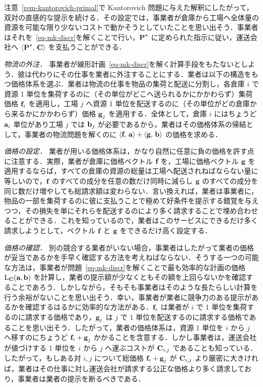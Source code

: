\begin{rem}\label{rem-kantorovich-dual}
注意~\ref{rem-kantorovich-primal}で Kantorovich 問題に与えた解釈にしたがって，双対の直感的な提示を続ける．その設定では，事業者が倉庫から工場へ全体量の資源を可能な限り少ないコストで動かそうとしていたことを思い出そう．事業者はそれを~\eqref{eq-mk-discr}を解くことで行い，$\P^\star$ に定められた指示に従い，運送会社へ $\dotp{\P^\star}{\C}$ を支払うことができる．

\emph{物流の外注．} 事業者が線形計画~\eqref{eq-mk-discr}を解く計算手段をもたないとしよう．彼は代わりにその仕事を業者に外注することにする．業者は以下の構造をもつ価格体系を選ぶ．業者は物流の仕事を物品の集荷と配送に分割し，各倉庫 $i$ で資源 1 単位を集荷するのに（その単位がどこへ送られるかにかかわらず）集荷価格 $\fD_i$ を適用し，工場 $j$ へ資源 1 単位を配送するのに（その単位がどの倉庫から来るかにかかわらず）価格 $\gD_j$ を適用する．全体として，倉庫 $i$ にはちょうど $\a_i$ 単位があり工場 $j$ では $\b_j$ が必要であるから，業者はその価格体系の帰結として，事業者の物流問題を解くのに $\dotp{\fD}{\a}+\dotp{\gD}{\b}$ の価格を求める．

\emph{価格の設定．} 業者が用いる価格体系は，かなり自然に任意に負の価格を許す点に注意する．実際，業者が倉庫に価格ベクトル $\fD$ を，工場に価格ベクトル $\gD$ を適用するならば，すべての倉庫の資源の総量は工場へ配送されねばならない量に等しいので，$\fD$ のすべての成分を任意の数だけ同時に減らし $\gD$ のすべての成分を同じ数だけ増やしても総請求額は変わらない．言い換えれば，業者は事業者に，物品の一部を集荷するのに彼に支払うことで極めて好条件を提示する錯覚を与えつつ，その損失を単にそれらを配送するのにより多く請求することで埋め合わせることができる．これを知っているので，業者はこのサービスにできるだけ多く請求しようとして，ベクトル $\fD$ と $\gD$ をできるだけ高く設定する．

\emph{価格の確認．} 別の競合する業者がいない場合，事業者はしたがって業者の価格が妥当であるかを手早く確認する方法を考えねばならない．そうする一つの可能な方法は，事業者が問題~\eqref{eq-mk-discr}を解くことで最も効率的な計画の価格 $\MKD_{\C}(\a,\b)$ を計算し，業者の提示額が少なくともその額を上回らないかを確認することであろう．しかしながら，そもそも事業者はそのような長たらしい計算を行う余裕がないことを思い出そう．幸い，事業者が業者に競争力のある提示があるかを確認するはるかに効率的な方法がある．$\fD_i$ は業者が $i$ で 1 単位を集荷するのに請求する価格であり，$\gD_j$ は $j$ で 1 単位を配送するのに請求する価格であることを思い出そう．したがって，業者の価格体系は，資源 1 単位を $i$ から $j$ へ移すのにちょうど $\fD_i+\gD_j$ かかることを含意する．しかし事業者は，運送会社が値づけする 1 単位を $i$ から $j$ へ運ぶコストが $\C_{i,j}$ であることも知っている．したがって，もしある対 $i,j$ について総価格 $\fD_i+\gD_j$ が $\C_{i,j}$ より厳密に大きければ，業者はその仕事に対し運送会社が請求する公正な価格より多く請求しており，事業者は業者の提示を断るべきである．



\end{rem}
